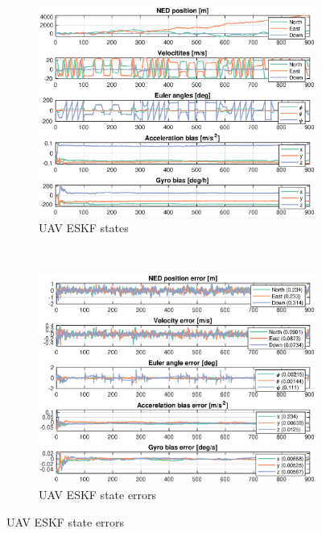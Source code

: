 \begin{figure}[ht]
    \centering
	\begin{subfigure}[b]{0.45\textwidth}
		\includegraphics[width=\textwidth]{figures/ga_2/sim_state}
		\caption{UAV ESKF states}
		\label{fig:ga_2_sim_state}
	\end{subfigure}%
       ~
	\begin{subfigure}[b]{0.45\textwidth}
		\includegraphics[width=\textwidth]{figures/ga_2/sim_errors}
		\caption{UAV ESKF state errors}
		\label{fig:ga_2_sim_errors}
	\end{subfigure}
    \label{fig:ga_2_sim_state_errors} 
\end{figure}

